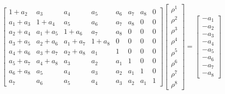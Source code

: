 \documentclass[12pt,letterpaper]{article}
\begin{document}
\[
\begin{bmatrix}
 1+a_2 & a_3 & a_4 & a_5 & a_6 & a_7 & a_8 & 0 \\
 a_1+a_3 & 1+a_4 & a_5 & a_6 & a_7 & a_8 & 0 & 0 \\
 a_2+a_4 & a_1+a_5 & 1+a_6 & a_7 & a_8 & 0 & 0 & 0 \\
 a_3+a_5 & a_2+a_6 & a_1+a_7 & 1+a_8 & 0 & 0 & 0 & 0 \\
 a_4+a_6 & a_3+a_7 & a_2+a_8 & a_1 & 1 & 0 & 0 & 0 \\
 a_5+a_7 & a_4+a_8 & a_3 & a_2 & a_1 & 1 & 0 & 0 \\
 a_6+a_8 & a_5 & a_4 & a_3 & a_2 & a_1 & 1 & 0 \\
 a_7 & a_6 & a_5 & a_4 & a_3 & a_2 & a_1 & 1
\end{bmatrix}
\begin{bmatrix}
 \rho^1 \\
 \rho^2 \\
 \rho^3 \\
 \rho^4 \\
 \rho^5 \\
 \rho^6 \\
 \rho^7 \\
 \rho^8
\end{bmatrix}
=
\begin{bmatrix}
 -a_1 \\
 -a_2 \\
 -a_3 \\
 -a_4 \\
 -a_5 \\
 -a_6 \\
 -a_7 \\
 -a_8
\end{bmatrix}
\]
\end{document}
